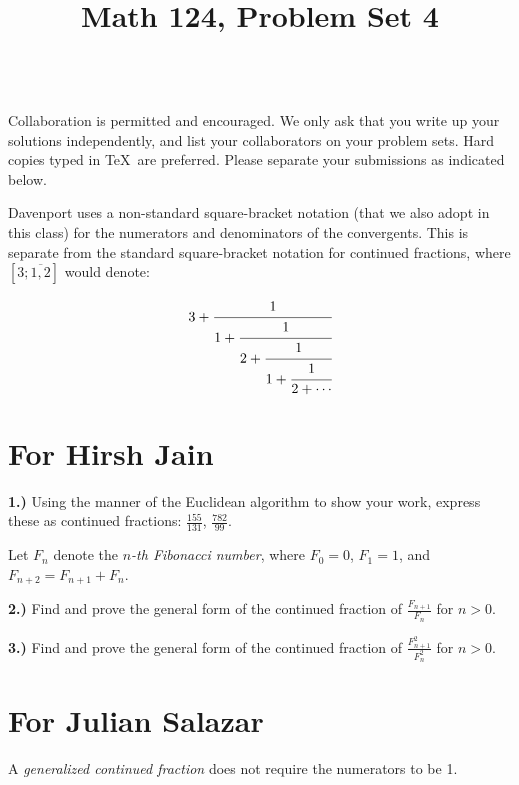 \documentclass[10pt]{amsart}
\title{Math 124, Problem Set 4}
\begin{document}
\maketitle

\\
 Collaboration is permitted and encouraged. We only ask that you write up your solutions independently, and list your collaborators on your problem sets. Hard copies typed in \TeX\  are preferred. Please separate your submissions as indicated below.

\medskip

 Davenport uses a non-standard square-bracket notation (that we also adopt in this class) for the numerators and denominators of the convergents. This is separate from the standard square-bracket notation for continued fractions, where $[3; \overline{1, 2}]$ would denote:

\[
3 + \cfrac{1}{1+\cfrac{1}{2+\cfrac{1}{1+\cfrac{1}{2+\dotsb}}}}
\]

\medskip

\section*{For Hirsh Jain}

{\bf 1.)} Using the manner of the Euclidean algorithm to show your work, express these as continued fractions: $\frac{155}{131}$, $\frac{782}{99}$.

\medskip

\noindent Let $F_n$ denote the \emph{$n$-th Fibonacci number}, where $F_0 = 0$, $F_1 = 1$, and $F_{n+2} = F_{n+1} + F_n$.

\medskip

{\bf 2.)} Find and prove the general form of the continued fraction of $\frac{F_{n+1}}{F_n}$ for $n > 0$.

\medskip

{\bf 3.)} Find and prove the general form of the continued fraction of $\frac{F_{n+1}^2}{F_n^2}$ for $n > 0$.

\section*{For Julian Salazar}

\noindent A \emph{generalized continued fraction} does not require the numerators to be 1.

\medskip
\end{document}
